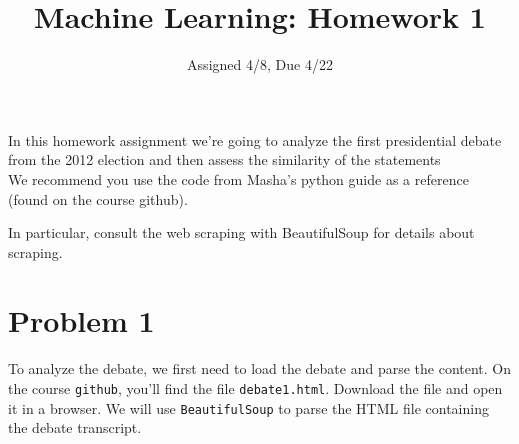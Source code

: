 \documentclass[12pt,letterpaper]{article}
\title{Machine Learning: Homework 1}
\date{Assigned 4/8, Due 4/22}
\begin{document}
\maketitle


In this homework assignment we're going to analyze the first presidential debate from the 2012 election and then assess the similarity of the statements  \\

We recommend you use the code from Masha's python guide as a reference (found on 
the course github). 

In particular, consult the web scraping with BeautifulSoup for details about scraping. 


\section*{Problem 1}
To analyze the debate, we first need to load the debate and parse the content.  On the course {\tt github}, you'll find the file {\tt debate1.html}.  Download the file and open it in a browser. We will use {\tt BeautifulSoup} to parse the HTML file containing the debate transcript.
\end{document}
